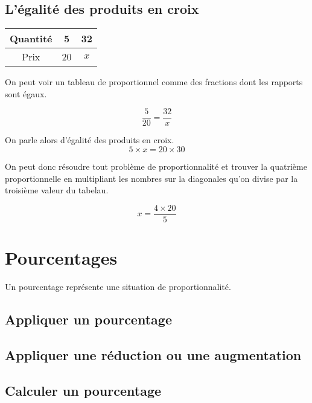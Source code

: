 \documentclass[paper=a4, fontsize=9pt]{scrartcl} %
\begin{document}
\begin{multicols}{2}

  \subsection*{L'égalité des produits en croix}

  \begin{center}
    \begin{tabular}{| c || c | c |}
      \hline
      Quantité & 5 & 32  \\
      \hline
      Prix     & 20 & $x$ \\ 
      \hline
    \end{tabular}
  \end{center}

  On peut voir un tableau de proportionnel comme des fractions dont les rapports sont égaux. 

  $$\dfrac{5}{20} = \dfrac{32}{x}$$

  On parle alors d'égalité des produits en croix.
  $$ 5 \times x = 20 \times 30 $$

  On peut donc résoudre tout problème de proportionnalité et trouver la quatrième proportionnelle en multipliant les nombres sur la diagonales qu'on divise par la troisième valeur du tabelau.

  $$x = \dfrac{4 \times 20}{5}$$

\end{multicols}



\section{Pourcentages}

Un pourcentage représente une situation de proportionnalité. 

\subsection{Appliquer un pourcentage}

\subsection{Appliquer une réduction ou une augmentation}


\subsection{Calculer un pourcentage}
\end{document}
